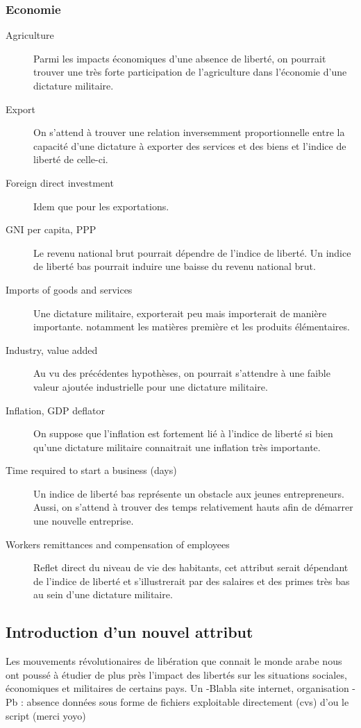 \subsubsection{Economie}
\begin{description}
\item [Agriculture]
Parmi les impacts économiques d'une absence de liberté, on pourrait trouver une très forte participation de l'agriculture dans l'économie d'une dictature militaire.
\item [Export]
On s'attend à trouver une relation inversemment proportionnelle entre la capacité d'une dictature à exporter des services et des biens et l'indice de liberté de celle-ci.
\item [Foreign direct investment]
Idem que pour les exportations. 
\item [GNI per capita, PPP ]
Le revenu national brut pourrait dépendre de l'indice de liberté. Un indice de liberté bas pourrait induire une baisse du revenu national brut.
\item [Imports of goods and services] 
Une dictature militaire, exporterait peu mais importerait de manière importante. notamment les matières première et les produits élémentaires.
\item [Industry, value added]
Au vu des précédentes hypothèses, on pourrait s'attendre à une faible valeur ajoutée industrielle pour une dictature militaire. 
\item [Inflation, GDP deflator] 
On suppose que l'inflation est fortement lié à l'indice de liberté si bien qu'une dictature militaire connaitrait une inflation très importante.

\item [Time required to start a business (days)]
Un indice de liberté bas représente un obstacle aux jeunes entrepreneurs. Aussi, on s'attend à trouver des temps relativement hauts afin de démarrer une nouvelle entreprise. 
\item [Workers remittances and compensation of employees]
Reflet direct du niveau de vie des habitants, cet attribut serait dépendant de l'indice de liberté et s'illustrerait par des salaires et des primes très bas au sein d'une dictature militaire.

\end{description}

\subsection{Introduction d'un nouvel attribut}
Les mouvements révolutionaires de libération que connait le monde arabe nous ont poussé à étudier de plus près l'impact des libertés sur les situations sociales, économiques et militaires de certains pays.
Un 
-Blabla site internet, organisation
-Pb : absence données sous forme de fichiers exploitable directement (cvs) d'ou le script (merci yoyo)
